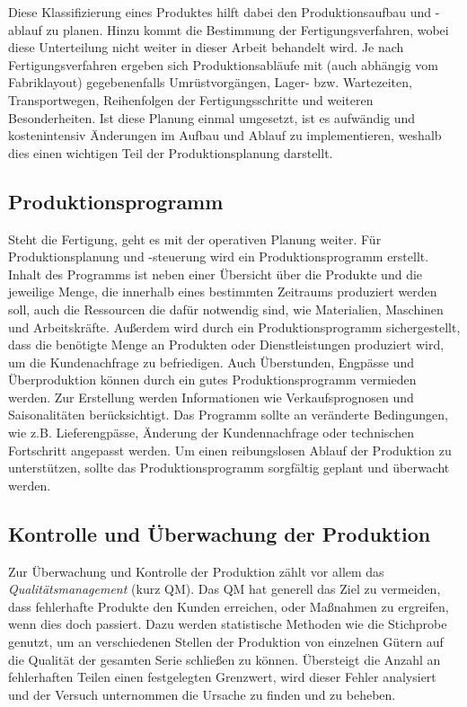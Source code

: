 \documentclass[a4paper,12pt, german]{report}
\begin{document}
Diese Klassifizierung eines Produktes hilft dabei den Produktionsaufbau und -ablauf zu planen. Hinzu kommt  die Bestimmung der Fertigungsverfahren, wobei diese Unterteilung nicht weiter in dieser Arbeit behandelt wird. Je nach Fertigungsverfahren ergeben sich Produktionsabläufe mit (auch abhängig vom Fabriklayout) gegebenenfalls Umrüstvorgängen, Lager- bzw. Wartezeiten, Transportwegen, Reihenfolgen der Fertigungsschritte und weiteren Besonderheiten. Ist diese Planung einmal umgesetzt, ist es aufwändig und kostenintensiv Änderungen im Aufbau und Ablauf zu implementieren, weshalb dies einen wichtigen Teil der Produktionsplanung darstellt.\cite{07}

\subsection{Produktionsprogramm}

Steht die Fertigung, geht es mit der operativen Planung weiter. Für Produktionsplanung und -steuerung wird ein Produktionsprogramm erstellt. Inhalt des Programms ist neben einer Übersicht über die Produkte und die jeweilige Menge, die innerhalb eines bestimmten Zeitraums produziert werden soll, auch die Ressourcen die dafür notwendig sind, wie Materialien, Maschinen und Arbeitskräfte. Außerdem wird durch ein Produktionsprogramm sichergestellt, dass die benötigte Menge an Produkten oder Dienstleistungen produziert wird, um die Kundenachfrage zu befriedigen. Auch Überstunden, Engpässe und Überproduktion können durch ein gutes Produktionsprogramm vermieden werden. Zur Erstellung werden Informationen wie Verkaufsprognosen und Saisonalitäten berücksichtigt. Das Programm sollte an veränderte Bedingungen, wie z.B. Lieferengpässe, Änderung der Kundennachfrage oder technischen Fortschritt angepasst werden. Um einen reibungslosen Ablauf der Produktion zu unterstützen, sollte das Produktionsprogramm sorgfältig geplant und überwacht werden.\cite{07}

\subsection{Kontrolle und Überwachung der Produktion}

Zur Überwachung und Kontrolle der Produktion zählt vor allem das \textit{Qualitätsmanagement} (kurz QM). Das QM hat generell das Ziel zu vermeiden, dass fehlerhafte Produkte den Kunden erreichen, oder Maßnahmen zu ergreifen, wenn dies doch passiert. Dazu werden statistische Methoden wie die Stichprobe genutzt, um an verschiedenen Stellen der Produktion von einzelnen Gütern auf die Qualität der gesamten Serie schließen zu können. Übersteigt die Anzahl an fehlerhaften Teilen einen festgelegten Grenzwert, wird dieser Fehler analysiert und der Versuch unternommen die Ursache zu finden und zu beheben.\cite{07}
\end{document}
